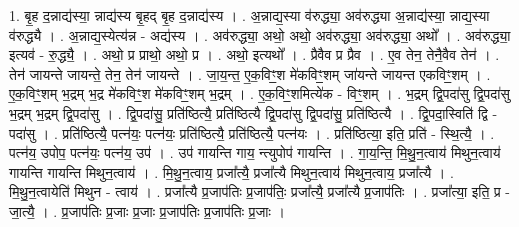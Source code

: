 \documentclass[17pt]{extarticle}
\begin{document}
1. बृ॒ह द॒न्नाद्य॑स्या॒ न्नाद्य॑स्य बृ॒हद् बृ॒ह द॒न्नाद्य॑स्य । . अ॒न्नाद्य॒स्या व॑रुद्ध्या॒ अव॑रुद्ध्या अ॒न्नाद्य॑स्या॒ न्नाद्य॒स्या व॑रुद्ध्यै । . अ॒न्नाद्य॒स्येत्य॑न्न - अद्य॑स्य । . अव॑रुद्ध्या॒ अथो॒ अथो॒ अव॑रुद्ध्या॒ अव॑रुद्ध्या॒ अथो᳚ । . अव॑रुद्ध्या॒ इत्यव॑ - रु॒द्ध्यै॒ । . अथो॒ प्र प्राथो॒ अथो॒ प्र । . अथो॒ इत्यथो᳚ । . प्रैवैव प्र प्रैव । . ए॒व तेन॒ तेनै॒वैव तेन॑ । . तेन॑ जायन्ते जायन्ते॒ तेन॒ तेन॑ जायन्ते । . जा॒य॒न्त॒ ए॒क॒विꣳ॒॒श मे॑कविꣳ॒॒शम् जा॑यन्ते जायन्त एकविꣳ॒॒शम् । . ए॒क॒विꣳ॒॒शम् भ॒द्रम् भ॒द्र मे॑कविꣳ॒॒श मे॑कविꣳ॒॒शम् भ॒द्रम् । . ए॒क॒विꣳ॒॒शमित्ये॑क - विꣳ॒॒शम् । . भ॒द्रम् द्वि॒पदा॑सु द्वि॒पदा॑सु भ॒द्रम् भ॒द्रम् द्वि॒पदा॑सु । . द्वि॒पदा॑सु॒ प्रति॑ष्ठित्यै॒ प्रति॑ष्ठित्यै द्वि॒पदा॑सु द्वि॒पदा॑सु॒ प्रति॑ष्ठित्यै । . द्वि॒पदा॒स्विति॑ द्वि - पदा॑सु । . प्रति॑ष्ठित्यै॒ पत्न॑यः॒ पत्न॑यः॒ प्रति॑ष्ठित्यै॒ प्रति॑ष्ठित्यै॒ पत्न॑यः । . प्रति॑ष्ठित्या॒ इति॒ प्रति॑ - स्थि॒त्यै॒ । . पत्न॑य॒ उपोप॒ पत्न॑यः॒ पत्न॑य॒ उप॑ । . उप॑ गायन्ति गाय॒ न्त्युपोप॑ गायन्ति । . गा॒य॒न्ति॒ मि॒थु॒न॒त्वाय॑ मिथुन॒त्वाय॑ गायन्ति गायन्ति मिथुन॒त्वाय॑ । . मि॒थु॒न॒त्वाय॒ प्रजा᳚त्यै॒ प्रजा᳚त्यै मिथुन॒त्वाय॑ मिथुन॒त्वाय॒ प्रजा᳚त्यै । . मि॒थु॒न॒त्वायेति॑ मिथुन - त्वाय॑ । . प्रजा᳚त्यै प्र॒जाप॑तिः प्र॒जाप॑तिः॒ प्रजा᳚त्यै॒ प्रजा᳚त्यै प्र॒जाप॑तिः । . प्रजा᳚त्या॒ इति॒ प्र - जा॒त्यै॒ । . प्र॒जाप॑तिः प्र॒जाः प्र॒जाः प्र॒जाप॑तिः प्र॒जाप॑तिः प्र॒जाः । \newline
\end{document}
